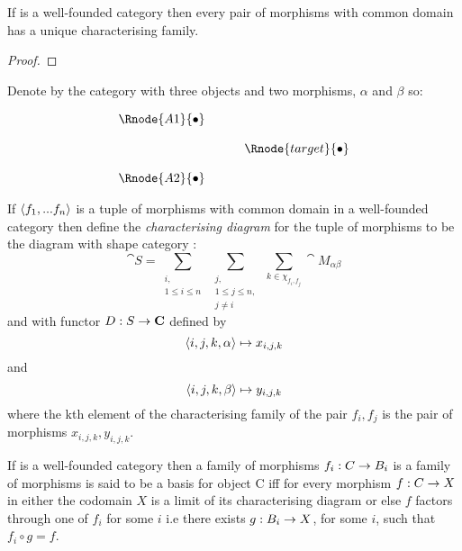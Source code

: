 \documentclass[10pt,a4paper]{article}
\begin{document}
\begin{lemma}
 If  is a well-founded category then every pair of morphisms with common domain has a unique characterising family.
\end{lemma}
\begin{proof}
\end{proof}
\begin{definition}
Denote by  the category with three objects and two morphisms, $\alpha$ and $\beta$ so:


\begin{center}
\begin{displaymath}
\begin{array}{cp{0.4cm} c}
\Rnode{A1}{\bullet}                  \\ [0.4cm]
                & & \Rnode{target}{\bullet} \\ [0.4cm]
\Rnode{A2}{\bullet} 
\end{array}
\end{displaymath}
\end{center}
\end{definition}

\begin{definition}
If $\left\langle f_1,...f_n\right\rangle$ is a tuple of morphisms with common domain in a well-founded category  then define the \textit{characterising diagram} for the tuple of morphisms
to be the diagram with shape category :
$$\cat{S}=\sum_{\substack{i,\\1 \leq i \leq n}} \  \sum_{\substack{j,\\ 1 \leq j \leq n,\\ j \neq i}} \ \sum_{k \in \chi_{f_i,f_j}} \cat{M}_{\alpha\beta}$$
and with functor $D: S \rightarrow \textbf{C}$ defined by
$$ \left\langle i,j,k,\alpha\right\rangle   \mapsto x_{i,j,k}$$
and
$$ \left\langle i,j,k,\beta\right\rangle   \mapsto y_{i,j,k}$$
where the kth element of the characterising family of the pair $f_i,f_j$ is the  pair of  morphisms $x_{i,j,k}, y_{i,j,k}$.
\end{definition}

\begin{definition}
If  is a well-founded category then a family of morphisms  $f_i: C \rightarrow B_i$ is a family of morphisms is said to
be a basis for object C iff for every morphism $f: C \rightarrow X$ in  either the codomain $X$ is a limit of its characterising diagram or else $f$ factors through one of $f_i$ for some $i$ i.e there exists $g:B_i \rightarrow X$, for some $i$, such that $f_i \circ g = f$.
\end{definition}
\end{document}
